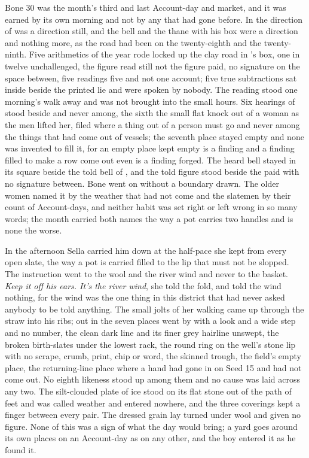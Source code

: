 Bone 30 was the month's third and last Account-day and market, and it was earned by its own morning and not by any that had gone before. In the direction of   was a direction still, and the bell and the thane with his box were a direction and nothing more, as the road had been on the twenty-eighth and the twenty-ninth. Five arithmetics of the year rode locked up the clay road in 's box, one in twelve unchallenged, the figure read still not the figure paid, no signature on the space between, five readings five and not one account; five true subtractions sat inside beside the printed lie and were spoken by nobody. The reading stood one morning's walk away and was not brought into the small hours. Six hearings of  stood beside and never among, the sixth the small flat knock out of a woman as the men lifted her, filed where a thing out of a person must go and never among the things that had come out of vessels; the seventh place stayed empty and none was invented to fill it, for an empty place kept empty is a finding and a finding filled to make a row come out even is a finding forged. The heard bell stayed in its square beside the told bell of , and the told figure stood beside the paid with no signature between. Bone went on without a boundary drawn. The older women named it by the weather that had not come and the slatemen by their count of Account-days, and neither habit was set right or left wrong in so many words; the month carried both names the way a pot carries two handles and is none the worse.

\scenebreak

In the afternoon Sella carried him down at the half-pace she kept from every open slate, the way a pot is carried filled to the lip that must not be slopped. The instruction went to the wool and the river wind and never to the basket. \emph{Keep it off his ears. It's the river wind}, she told the fold, and told the wind nothing, for the wind was the one thing in this district that had never asked anybody to be told anything. The small jolts of her walking came up through the straw into his ribs; out in  the seven places went by with a look and a wide step and no number, the clean dark line and its finer grey hairline unswept, the broken birth-slates under the lowest rack, the round ring on the well's stone lip with no scrape, crumb, print, chip or word, the skinned trough, the field's empty place, the returning-line place where a hand had gone in on Seed 15 and had not come out. No eighth likeness stood up among them and no cause was laid across any two. The silt-clouded plate of ice stood on its flat stone out of the path of feet and was called weather and entered nowhere, and the three coverings kept a finger between every pair. The dressed grain lay turned under wool and given no figure. None of this was a sign of what the day would bring; a yard goes around its own places on an Account-day as on any other, and the boy entered it as he found it.

